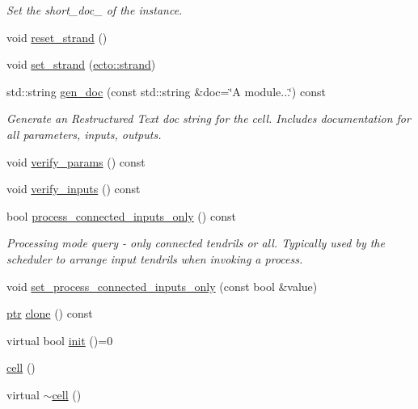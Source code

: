 \begin{DoxyCompactItemize}
\begin{DoxyCompactList}\small\item\em Set the short\-\_\-doc\-\_\- of the instance. \end{DoxyCompactList}\item 
void \hyperlink{structecto_1_1cell_af32a9e2113b7afcb5b225bdc3c234e8c}{reset\-\_\-strand} ()
\item 
void \hyperlink{structecto_1_1cell_ae0009fc4a4d12d400126f455396f5c9f}{set\-\_\-strand} (\hyperlink{structecto_1_1strand}{ecto\-::strand})
\item 
std\-::string \hyperlink{structecto_1_1cell_a486454d7466c5f0373ecb42dd4e97b2f}{gen\-\_\-doc} (const std\-::string \&doc=\char`\"{}A module...\char`\"{}) const 
\begin{DoxyCompactList}\small\item\em Generate an Restructured Text doc string for the cell. Includes documentation for all parameters, inputs, outputs. \end{DoxyCompactList}\item 
void \hyperlink{structecto_1_1cell_aa03c0f569bb4b14e81f4d2a8747273e5}{verify\-\_\-params} () const 
\item 
void \hyperlink{structecto_1_1cell_aed712e80344ce04dbb9105bb6a1aa53a}{verify\-\_\-inputs} () const 
\item 
bool \hyperlink{structecto_1_1cell_ab1dfafd237e0adf273af65d549e7516e}{process\-\_\-connected\-\_\-inputs\-\_\-only} () const 
\begin{DoxyCompactList}\small\item\em Processing mode query -\/ only connected tendrils or all. Typically used by the scheduler to arrange input tendrils when invoking a process. \end{DoxyCompactList}\item 
void \hyperlink{structecto_1_1cell_a4c42ef400acac92d825e7dc25ff53bdc}{set\-\_\-process\-\_\-connected\-\_\-inputs\-\_\-only} (const bool \&value)
\item 
\hyperlink{structecto_1_1cell_af2cab9d2bc012088c4f58c40da57a862}{ptr} \hyperlink{structecto_1_1cell_a213dabd285300f5d4c7e0f5fd6142e81}{clone} () const 
\item 
virtual bool \hyperlink{structecto_1_1cell_ab9a6c3fd8f76289f338a9e05368b1aff}{init} ()=0
\item 
\hyperlink{structecto_1_1cell_a782c9d0f521f8a34c8eed309d0d8d79a}{cell} ()
\item 
virtual \hyperlink{structecto_1_1cell_a98748014df1b1a4fd3fbb47f6adc8c5e}{$\sim$cell} ()

\end{DoxyCompactItemize}
